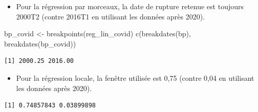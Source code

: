 \documentclass[
  a4paper,
  DIV=11,
  numbers=noendperiod,
  french]{scrartcl}
\newenvironment{Shaded}{\begin{snugshade}}{\end{snugshade}}
\newcommand{\AttributeTok}[1]{\textcolor[rgb]{0.40,0.45,0.13}{#1}}
\newcommand{\DecValTok}[1]{\textcolor[rgb]{0.68,0.00,0.00}{#1}}
\newcommand{\FunctionTok}[1]{\textcolor[rgb]{0.28,0.35,0.67}{#1}}
\newcommand{\NormalTok}[1]{\textcolor[rgb]{0.00,0.23,0.31}{#1}}
\newcommand{\OtherTok}[1]{\textcolor[rgb]{0.00,0.23,0.31}{#1}}
\newcommand{\SpecialCharTok}[1]{\textcolor[rgb]{0.37,0.37,0.37}{#1}}
\newcommand{\StringTok}[1]{\textcolor[rgb]{0.13,0.47,0.30}{#1}}
\providecommand{\tightlist}{%
  \setlength{\itemsep}{0pt}\setlength{\parskip}{0pt}}\usepackage{longtable,booktabs,array}
\newcommand\1{{\mathds 1}}
\theoremstyle{remark}
\begin{document}
\begin{itemize}
\tightlist
\item
  Pour la régression par morceaux, la date de rupture retenue est
  toujours 2000T2 (contre 2016T1 en utilisant les données après 2020).
\end{itemize}

\begin{Shaded}
\begin{Highlighting}[]
\NormalTok{bp\_covid }\OtherTok{\textless{}{-}} \FunctionTok{breakpoints}\NormalTok{(reg\_lin\_covid)}
\FunctionTok{c}\NormalTok{(}\FunctionTok{breakdates}\NormalTok{(bp), }\FunctionTok{breakdates}\NormalTok{(bp\_covid))}
\end{Highlighting}
\end{Shaded}

\begin{verbatim}
[1] 2000.25 2016.00
\end{verbatim}

\begin{itemize}
\tightlist
\item
  Pour la régression locale, la fenêtre utilisée est 0,75 (contre 0,04
  en utilisant les données après 2020).
\end{itemize}

\begin{Shaded}
\end{Shaded}

\begin{verbatim}
[1] 0.74857843 0.03899898
\end{verbatim}
\end{document}

